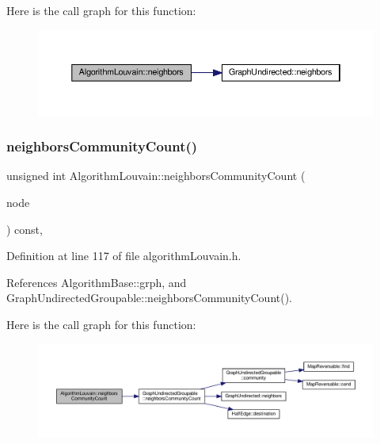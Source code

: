 Here is the call graph for this function\+:
\nopagebreak
\begin{figure}[H]
\begin{center}
\leavevmode
\includegraphics[width=350pt]{classAlgorithmLouvain_a46c54a194acf1a09debfaf3f67d84f85_cgraph}
\end{center}
\end{figure}
\mbox{\label{classAlgorithmLouvain_a69439ee5f0cf1180d15a244500bfc663}} 
\subsubsection{\texorpdfstring{neighbors\+Community\+Count()}{neighborsCommunityCount()}}
{\footnotesize\ttfamily unsigned int Algorithm\+Louvain\+::neighbors\+Community\+Count (\begin{DoxyParamCaption}\item[{const \hyperlink{edge_8h_a5fbd20c46956d479cb10afc9855223f6}{type\+Vertex} \&}]{node }\end{DoxyParamCaption}) const\hspace{0.3cm}{\ttfamily [inline]}, {\ttfamily [private]}}



Definition at line 117 of file algorithm\+Louvain.\+h.



References Algorithm\+Base\+::grph, and Graph\+Undirected\+Groupable\+::neighbors\+Community\+Count().

Here is the call graph for this function\+:
\nopagebreak
\begin{figure}[H]
\begin{center}
\leavevmode
\includegraphics[width=350pt]{classAlgorithmLouvain_a69439ee5f0cf1180d15a244500bfc663_cgraph}
\end{center}
\end{figure}
\mbox{\label{classAlgorithmLouvain_a133f057d5d84332e347a0f01700101ae}} 
